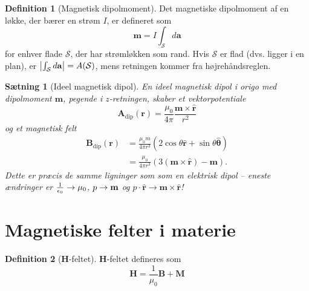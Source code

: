 \documentclass[]{article}
\newcommand{\hr}{\hat{\mathbf{r}}}
\newcommand{\hth}{\hat{\bm{\theta}}}
\newtheorem{theorem}{Sætning}
\theoremstyle{definition}
\newtheorem{definition}{Definition}
\begin{document}
\begin{definition}[Magnetisk dipolmoment]
	Det magnetiske dipolmoment af en løkke, der bærer en strøm $I$, er defineret som
	\begin{equation*}
		\mathbf{m} = I \int_\mathcal{S}{d\mathbf{a}}
	\end{equation*}
	for enhver flade $\mathcal{S}$, der har strømløkken som rand. Hvis $\mathcal{S}$ er flad (dvs. ligger i en plan), er $\abs{\int_\mathcal{S}{d\mathbf{a}}} = A(\mathcal{S})$, mens retningen kommer fra højrehåndsreglen.
\end{definition}

\begin{theorem}[Ideel magnetisk dipol]
	En ideel magnetisk dipol i origo med dipolmoment $\mathbf{m}$, pegende i $z$-retningen, skaber et vektorpotentiale
	\begin{equation*}
		\mathbf{A}_\text{dip}(\mathbf{r}) = \frac{\mu_0}{4\pi} \frac{\mathbf{m} \times \hat {\mathbf{r}}}{r^2}
	\end{equation*}
	og et magnetisk felt
	\begin{align*}
		\mathbf{B}_\text{dip}(\mathbf{r}) &= \frac{\mu_0m}{4\pi r^3}(2 \cos \theta \hr + \sin \theta \hth)\\
		&= \frac{\mu_0}{4\pi r^3}(3(\mathbf{m}\times \hr) - \mathbf{m}).
	\end{align*}
	Dette er præcis de samme ligninger som som en elektrisk dipol -- eneste ændringer er $\frac{1}{\epsilon_0} \rightarrow \mu_0$, $p \rightarrow \mathbf{m} $ og $p \cdot \hr \rightarrow \mathbf{m}\times \hr $!
\end{theorem}

\section{Magnetiske felter i materie}

\begin{definition}[$\mathbf{H}$-feltet]
	$\mathbf{H}$-feltet defineres som
	\begin{equation*}
		\mathbf{H} = \dfrac{1}{\mu_0} \mathbf{B} + \mathbf{M}
	\end{equation*}
\end{definition}
\end{document}
